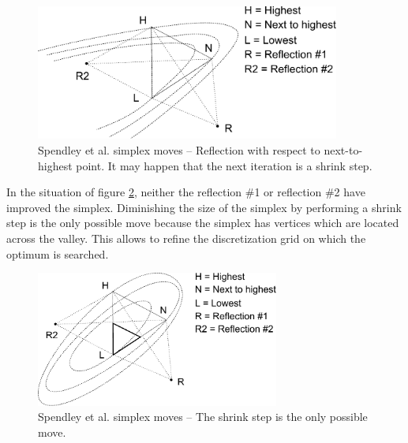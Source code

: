 \begin{figure}
\begin{center}
\includegraphics[width=10cm]{spendleymethod/spendley-steps-reflect2.pdf}
\end{center}
\caption{Spendley et al. simplex moves -- Reflection with respect to next-to-highest point. 
It may happen that the next iteration is a shrink step.}
\label{fig-spendley-moves-reflect2}
\end{figure}

In the situation of figure \ref{fig-spendley-moves-shrink}, neither the 
reflection \#1 or reflection \#2 have improved the simplex. 
Diminishing the size of the simplex by performing a shrink step 
is the only possible move because the 
simplex has vertices which are located across the valley.
This allows to refine the discretization grid on which the 
optimum is searched.

\begin{figure}
\begin{center}
\includegraphics[width=8cm]{spendleymethod/spendley-steps-shrink.pdf}
\end{center}
\caption{Spendley et al. simplex moves -- The shrink step is the 
only possible move.}
\label{fig-spendley-moves-shrink}
\end{figure}




